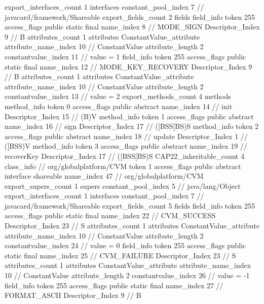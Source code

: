{{{{			}
			export_interfaces_count	1
			interfaces {
				constant_pool_index	7		// javacard/framework/Shareable
			}
			export_fields_count	2
			fields {
			field_info {
				token	255
				access_flags	public static final
				name_index	8		// MODE_SIGN
				Descriptor_Index	9		// B
				attributes_count	1
				attributes {
				ConstantValue_attribute {
					attribute_name_index	10		// ConstantValue
					attribute_length	2
					constantvalue_index	11		// value = 1
				}
				}
			}
			field_info {
				token	255
				access_flags	public static final
				name_index	12		// MODE_KEY_RECOVERY
				Descriptor_Index	9		// B
				attributes_count	1
				attributes {
				ConstantValue_attribute {
					attribute_name_index	10		// ConstantValue
					attribute_length	2
					constantvalue_index	13		// value = 2
				}
				}
			}
			}
			export_methods_count	4
			methods {
				method_info {
					token	0
					access_flags	public abstract
					name_index	14		// init
					Descriptor_Index	15		// (B)V
				}
				method_info {
					token	1
					access_flags	public abstract
					name_index	16		// sign
					Descriptor_Index	17		// ([BSS[BS)S
				}
				method_info {
					token	2
					access_flags	public abstract
					name_index	18		// update
					Descriptor_Index	1		// ([BSS)V
				}
				method_info {
					token	3
					access_flags	public abstract
					name_index	19		// recoverKey
					Descriptor_Index	17		// ([BSS[BS)S
				}
			}
			CAP22_inheritable_count	4
		}
		class_info {		// org/globalplatform/CVM
			token	1
			access_flags	public abstract interface shareable
			name_index	47		// org/globalplatform/CVM
			export_supers_count	1
			supers {
				constant_pool_index	5		// java/lang/Object
			}
			export_interfaces_count	1
			interfaces {
				constant_pool_index	7		// javacard/framework/Shareable
			}
			export_fields_count	5
			fields {
			field_info {
				token	255
				access_flags	public static final
				name_index	22		// CVM_SUCCESS
				Descriptor_Index	23		// S
				attributes_count	1
				attributes {
				ConstantValue_attribute {
					attribute_name_index	10		// ConstantValue
					attribute_length	2
					constantvalue_index	24		// value = 0
				}
				}
			}
			field_info {
				token	255
				access_flags	public static final
				name_index	25		// CVM_FAILURE
				Descriptor_Index	23		// S
				attributes_count	1
				attributes {
				ConstantValue_attribute {
					attribute_name_index	10		// ConstantValue
					attribute_length	2
					constantvalue_index	26		// value = -1
				}
				}
			}
			field_info {
				token	255
				access_flags	public static final
				name_index	27		// FORMAT_ASCII
				Descriptor_Index	9		// B
}}}}}
